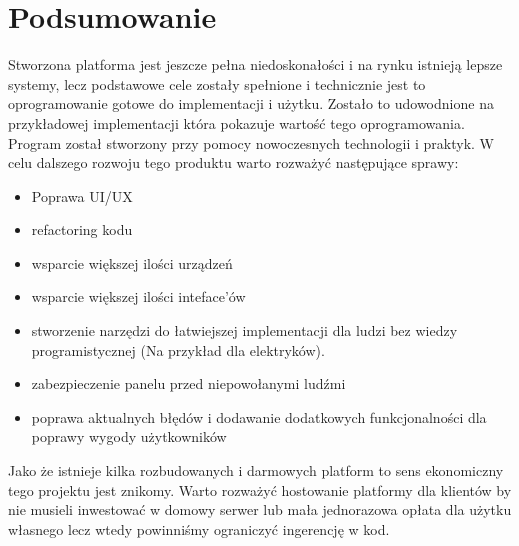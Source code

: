 \chapter{Podsumowanie}
\label{chap:podsumowanie}
Stworzona platforma jest jeszcze pełna niedoskonałości i na rynku istnieją lepsze systemy, lecz podstawowe cele zostały spełnione i technicznie jest to oprogramowanie gotowe do implementacji i użytku. Zostało to udowodnione na przykładowej implementacji która pokazuje wartość tego oprogramowania. Program został stworzony przy pomocy nowoczesnych technologii i praktyk. W celu dalszego rozwoju tego produktu warto rozważyć następujące sprawy:
\begin{itemize}
    \item Poprawa UI/UX
    \item refactoring kodu
    \item wsparcie większej ilości urządzeń
    \item wsparcie większej ilości inteface'ów
    \item stworzenie narzędzi do łatwiejszej implementacji dla ludzi bez wiedzy programistycznej (Na przykład dla elektryków).
    \item zabezpieczenie panelu przed niepowołanymi ludźmi
    \item poprawa aktualnych błędów i dodawanie dodatkowych funkcjonalności dla poprawy wygody użytkowników
\end{itemize}
Jako że istnieje kilka rozbudowanych i darmowych platform to sens ekonomiczny tego projektu jest znikomy. Warto rozważyć hostowanie platformy dla klientów by nie musieli inwestować w domowy serwer lub mała jednorazowa opłata dla użytku własnego lecz wtedy powinniśmy ograniczyć ingerencję w kod. 